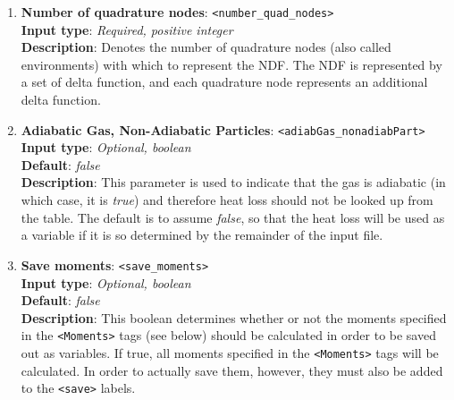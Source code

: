 \begin{enumerate}
%
\item {\bf Number of quadrature nodes}: \verb=<number_quad_nodes>= \\
{\bf Input type}: {\it Required, positive integer} \\
{\bf Description}: Denotes the number of quadrature nodes (also called environments) with which to represent the NDF. The NDF is represented by a set of delta function, and each quadrature node represents an additional delta function.
%
\item {\bf Adiabatic Gas, Non-Adiabatic Particles}: \verb=<adiabGas_nonadiabPart>= \\
{\bf Input type}: {\it Optional, boolean} \\
{\bf Default}: {\it false} \\
{\bf Description}: This parameter is used to indicate that the gas is adiabatic (in which case, it is {\it true}) and therefore heat loss should not be looked up from the table.  The default is to assume {\it false}, so that the heat loss will be used as a variable if it is so determined by the remainder of the input file.
%
\item {\bf Save moments}: \verb=<save_moments>= \\
{\bf Input type}: {\it Optional, boolean} \\
{\bf Default}: {\it false} \\
{\bf Description}: This boolean determines whether or not the moments specified in the \verb=<Moments>= tags (see below) should be calculated in order to be saved out as variables.  If true, all moments specified in the \verb=<Moments>= tags will be calculated.  In order to actually save them, however, they must also be added to the \verb=<save>= labels.
%
\end{enumerate}




